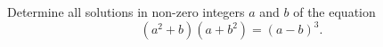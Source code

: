 Determine all solutions in non-zero integers $a$ and $b$ of the equation \[(a^2+b)(a+b^2) = (a-b)^3.\]